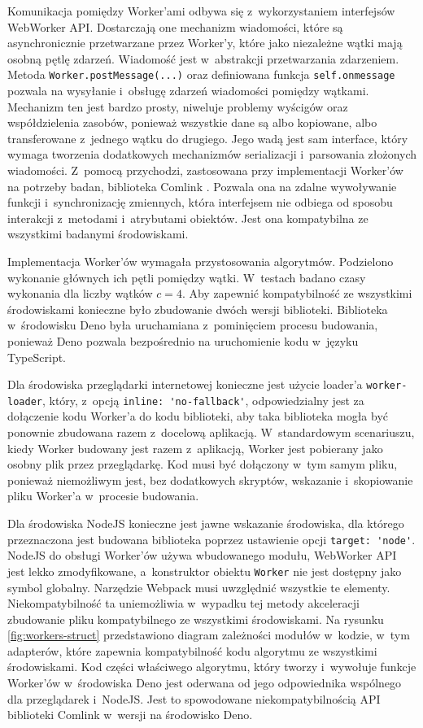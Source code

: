 Komunikacja pomiędzy Worker'ami odbywa się z~wykorzystaniem interfejsów WebWorker API. Dostarczają one mechanizm wiadomości, które są asynchronicznie przetwarzane przez Worker'y, które jako niezależne wątki mają osobną pętlę zdarzeń. Wiadomość jest w~abstrakcji przetwarzania zdarzeniem. Metoda \lstinline{Worker.postMessage(...)} oraz definiowana funkcja \lstinline{self.onmessage} pozwala na wysyłanie i~obsługę zdarzeń wiadomości pomiędzy wątkami. Mechanizm ten jest bardzo prosty, niweluje problemy wyścigów oraz współdzielenia zasobów, ponieważ wszystkie dane są albo kopiowane, albo transferowane z~jednego wątku do drugiego. Jego wadą jest sam interface, który wymaga tworzenia dodatkowych mechanizmów serializacji i~parsowania złożonych wiadomości. Z~pomocą przychodzi, zastosowana przy implementacji Worker'ów na potrzeby badan, biblioteka Comlink \cite{comlink}. Pozwala ona na zdalne wywoływanie funkcji i~synchronizację zmiennych, która interfejsem nie odbiega od sposobu interakcji z~metodami i~atrybutami obiektów. Jest ona kompatybilna ze wszystkimi badanymi środowiskami. 

Implementacja Worker'ów wymagała przystosowania algorytmów. Podzielono wykonanie głównych ich pętli pomiędzy wątki. W~testach badano czasy wykonania dla liczby wątków $c=4$. Aby zapewnić kompatybilność ze wszystkimi środowiskami konieczne było zbudowanie dwóch wersji biblioteki. Biblioteka w~środowisku Deno była uruchamiana z~pominięciem procesu budowania, ponieważ Deno pozwala bezpośrednio na uruchomienie kodu w~języku TypeScript. 

Dla środowiska przeglądarki internetowej konieczne jest użycie loader'a \lstinline{worker-loader}, który, z~opcją \lstinline{inline: 'no-fallback'}, odpowiedzialny jest za dołączenie kodu Worker'a do kodu biblioteki, aby taka biblioteka mogła być ponownie zbudowana razem z~docelową aplikacją. W~standardowym scenariuszu, kiedy Worker budowany jest razem z~aplikacją, Worker jest pobierany jako osobny plik przez przeglądarkę. Kod musi być dołączony w~tym samym pliku, ponieważ niemożliwym jest, bez dodatkowych skryptów, wskazanie i~skopiowanie pliku Worker'a w~procesie budowania.

Dla środowiska NodeJS konieczne jest jawne wskazanie środowiska, dla którego przeznaczona jest budowana biblioteka poprzez ustawienie opcji \lstinline{target: 'node'}. NodeJS do obsługi Worker'ów używa wbudowanego modułu, WebWorker API jest lekko zmodyfikowane, a~konstruktor obiektu \lstinline{Worker} nie jest dostępny jako symbol globalny. Narzędzie Webpack musi uwzględnić wszystkie te elementy. Niekompatybilność ta uniemożliwia w~wypadku tej metody akceleracji zbudowanie pliku kompatybilnego ze wszystkimi środowiskami. Na rysunku \ref{fig:workers-struct} przedstawiono diagram zależności modułów w~kodzie, w~tym adapterów, które zapewnia kompatybilność kodu algorytmu ze wszystkimi środowiskami. Kod części właściwego algorytmu, który tworzy i~wywołuje funkcje Worker'ów w~środowiska Deno jest oderwana od jego odpowiednika wspólnego dla przeglądarek i~NodeJS. Jest to spowodowane niekompatybilnością API biblioteki Comlink w~wersji na środowisko Deno.

